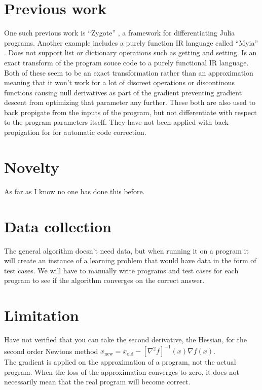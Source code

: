 \documentclass{article}
\begin{document}
\section*{Previous work}
One such previous work is ``Zygote'' \cite{DBLP:journals/corr/abs-1907-07587}, a framework for differentiating Julia programs. Another example includes a purely function IR language called ``Myia'' \cite{DBLP:journals/corr/abs-1810-11530}. Does not support list or dictionary operations such as getting and setting. Is an exact transform of the program souce code to a purely functional IR language.\\
Both of these seem to be an exact transformation rather than an approximation meaning that it won't work for a lot of discreet operations or discontinous functions causing null derivatives as part of the gradient preventing gradient descent from optimizing that parameter any further.
These both are also used to back propigate from the inputs of the program, but not differentiate with respect to the program parameters itself. They have not been applied with back propigation for for automatic code correction.

\section*{Novelty}
As far as I know no one has done this before.

\section*{Data collection}
The general algorithm doesn't need data, but when running it on a program it will create an instance of a learning problem that would have data in the form of test cases. We will have to manually write programs and test cases for each program to see if the algorithm converges on the correct answer.

\section*{Limitation}
Have not verified that you can take the second derivative, the Hessian, for the second order Newtons method $x_{\mathrm{new}} = x_{\mathrm{old}} - [\nabla^2 f]^{-1}(x) \nabla f(x)$.\\
The gradient is applied on the approximation of a program, not the actual program. When the loss of the approximation converges to zero, it does not necessarily mean that the real program will become correct.


\end{document}
